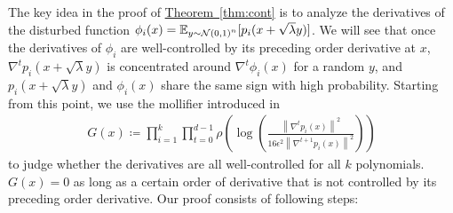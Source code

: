 \documentclass[12pt]{article}
\newcommand{\thm}[1]{\hyperref[thm:#1]{Theorem~\ref*{thm:#1}}}
\newcommand{\grad}[2]{\nabla^{#1}{#2}}
\newcommand{\br}[1]{\left(#1\right)} \newcommand{\Br}[1]{\left[#1\right]} \newcommand{\st}[1]{\left\{#1\right\}} \newcommand{\tr}[1]{\mathrm{Tr}\!\Br{#1}} \newcommand{\abs}[1]{\left|#1 \right|} \newcommand{\norm}[1]{\left\lVert #1 \right\rVert} \newcommand{\agl}[2]{\theta^{\br{#1}}_{#2}} \newcommand{\aglp}[2]{{\theta'}^{\br{#1}}_{#2}} \newcommand{\lint}[1]{\left\lfloor#1\right\rfloor} \newcommand{\poly}[1]{\mathrm{poly}\!\br{#1}} \newcommand{\negl}[1]{\mathrm{negl}\!\br{#1}} \newcommand{\de}[1]{\mathrm{d}#1} \newcommand{\val}[1]{\mathrm{val}\!\br{#1}} \newcommand{\vall}[1]{\mathrm{val}\br{#1}} \newcommand{\nd}[1]{\mathcal{N}\!\br{#1}} \newcommand{\ketbratwo}[2]{\ket{#1} \hspace{-0.4em}\bra{#2}} \newcommand{\ketbra}[1]{\ketbratwo{#1}{#1}} \newcommand{\id}{\ensuremath{\mathds{1}}} \newcommand{\ogroup}[1]{\mathrm{O}\!\br{#1}} \newcommand{\ugroup}[1]{\mathrm{U}\!\br{#1}} \newcommand{\td}{\mathrm{TD}} \newcommand{\tv}[1]{\norm{#1}_{\mathrm{TV}}} \newcommand {\defeq} {\ensuremath{ \stackrel{\mathrm{def}}{=} }} \newcommand{\vdim}{\ensuremath{N}} \newcommand{\dimin}{\ensuremath{n}} \newcommand{\dimout}{\ensuremath{m}} \newcommand{\ncopy}{\ell} \newcommand{\hspacein}{\H_\mathrm{in}} \newcommand{\hspaceout}{\H_\mathrm{out}} \newcommand{\Sin}{\S(\hspacein)} \newcommand{\Sout}{\S(\hspaceout)} \newcommand{\haar}{\ensuremath{\mu}} \newcommand{\tensorhaar}{\ensuremath{\eta}} \newcommand{\tensorsrss}{\ensuremath{\nu}} \newcommand{\qadvice}{\ensuremath{\rho}} \newcommand{\tp}{\otimes} \newcommand{\wone}[2]{W_1\!\br{#1,#2}}
\begin{document}
The key idea in the proof of \thm{cont} is 
to analyze the derivatives of the disturbed function
$\phi_i(x) = \E_{y\sim\NN\br{0,1}^n}[p_i(x+\sqrt{\lambda}y)]$.
We will see that
once the derivatives of $\phi_i$ are well-controlled by its preceding order derivative at $x$,
$\grad{t}{p_i(x+\sqrt{\lambda}y)}$ is concentrated around
$\grad{t}{\phi_i(x)}$
for a random $y$,
and $p_i(x+\sqrt{\lambda}y)$ and $\phi_i(x)$
share the same sign with high probability.
Starting from this point, we use the mollifier introduced in~\cite{KM22}
\begin{align}
	G(x)\coloneqq \prod_{i=1}^{k} \prod_{t=0}^{d-1} \rho\!\br{\log\!\br{\frac{\norm{\grad{t}{p_i(x)}}^2}{16\epsilon^2 \norm{\grad{t+1}{p_i(x)}}^2 }}} \label{eq:molli}
\end{align}
to judge whether the derivatives are all well-controlled for all $k$ polynomials.
$G(x)=0$ as long as a certain order of derivative that is not controlled by its preceding order derivative.
Our proof consists of following steps:
\end{document}
